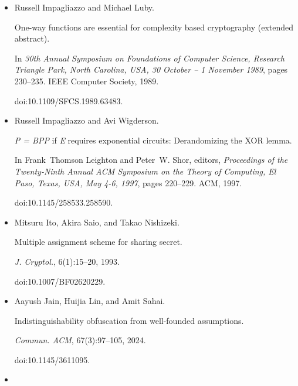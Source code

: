 \begin{itemize}
doi:10.1109/FSCS.1990.89604.





\item[] 
[25]

Russell Impagliazzo and Michael Luby.


One-way functions are essential for complexity based cryptography
(extended abstract).


In \emph{30th Annual Symposium on Foundations of Computer Science,
Research Triangle Park, North Carolina, USA, 30 October – 1 November 1989},
pages 230–235. IEEE Computer Society, 1989.


doi:10.1109/SFCS.1989.63483.





\item[] 
[26]

Russell Impagliazzo and Avi Wigderson.


\emph{P = BPP} if \emph{E} requires exponential circuits:
Derandomizing the XOR lemma.


In Frank Thomson Leighton and Peter W. Shor, editors, \emph{Proceedings of the Twenty-Ninth Annual ACM Symposium on the Theory of
Computing, El Paso, Texas, USA, May 4-6, 1997}, pages 220–229. ACM, 1997.


doi:10.1145/258533.258590.





\item[] 
[27]

Mitsuru Ito, Akira Saio, and Takao Nishizeki.


Multiple assignment scheme for sharing secret.


\emph{J. Cryptol.}, 6(1):15–20, 1993.


doi:10.1007/BF02620229.





\item[] 
[28]

Aayush Jain, Huijia Lin, and Amit Sahai.


Indistinguishability obfuscation from well-founded assumptions.


\emph{Commun. ACM}, 67(3):97–105, 2024.


doi:10.1145/3611095.





\item[] 
[29]


\end{itemize}
